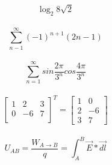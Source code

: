 \documentclass[a4paper]{article}
\begin{document}
$$
\log_{2}8{\sqrt{2}} $$
\\
$$ \sum_{n-1}^{\infty}(-1)^{n+1}(2n-1)$$
\\
$$ \sum_{n=1}^{\infty}sin \frac{2\pi}{3^n}cos \frac{4\pi}{3^n} $$
\\
$$  
\left [ \begin{array}{ccc}
1 & 2 & 3 \\
0 & -6 & 7 \\
\end{array}
\right]^T
=
\left [ \begin{array}{ll}
1 & 0 \\
2 & -6 \\
3 & 7
\end{array}
\right] $$
\\
$$
U_{AB} = \frac{W_{A \rightarrow B}}{q} =
\int_{A}^{B} \vec{E}*\vec{dl}
$$
\end{document}
